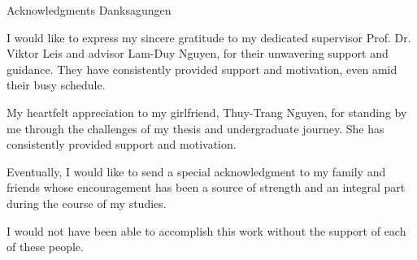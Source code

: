 \makeatletter
{}
{}
{}
\makeatother
\thispagestyle{empty}

\vspace*{20mm}

\begin{center}
\makeatletter
{}
{ Acknowledgments}
{ Danksagungen}
\makeatother
\end{center}

\vspace{10mm}

I would like to express my sincere gratitude to my dedicated supervisor Prof. Dr. Viktor Leis and advisor Lam-Duy Nguyen, for their unwavering support and guidance. They have consistently provided support and motivation, even amid their busy schedule.

My heartfelt appreciation to my girlfriend, Thuy-Trang Nguyen, for standing by me through the challenges of my thesis and undergraduate journey. She has consistently provided support and motivation.

Eventually, I would like to send a special acknowledgment to my family and friends whose encouragement has been a source of strength and an integral part during the course of my studies.

I would not have been able to accomplish this work without the support of each of these people.

\cleardoublepage{}
